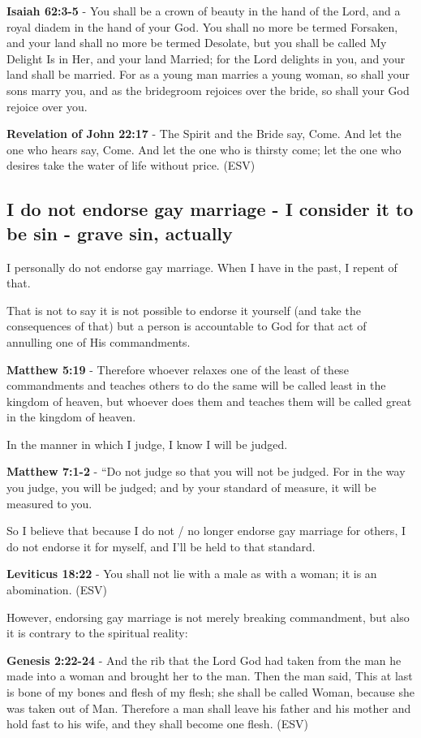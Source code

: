 \documentclass[11pt]{article}
\begin{document}
\textbf{Isaiah 62:3-5} - You shall be a crown of beauty in the hand of the Lord, and a royal diadem in the hand of your God. You shall no more be termed Forsaken, and your land shall no more be termed Desolate, but you shall be called My Delight Is in Her, and your land Married; for the Lord delights in you, and your land shall be married. For as a young man marries a young woman, so shall your sons marry you, and as the bridegroom rejoices over the bride, so shall your God rejoice over you.

\textbf{Revelation of John 22:17} - The Spirit and the Bride say, Come. And let the one who hears say, Come. And let the one who is thirsty come; let the one who desires take the water of life without price. (ESV)

\subsection{I do not endorse gay marriage - I consider it to be sin - grave sin, actually}
\label{sec:org8e55b81}
I personally do not endorse gay marriage. When I have in the past, I repent of that.

That is not to say it is not possible to endorse it yourself (and take the consequences of that) but a person is accountable to God for that act of annulling one of His commandments.

\textbf{Matthew 5:19} - Therefore whoever relaxes one of the least of these commandments and teaches others to do the same will be called least in the kingdom of heaven, but whoever does them and teaches them will be called great in the kingdom of heaven.

In the manner in which I judge, I know I will be judged.

\textbf{Matthew 7:1-2} - “Do not judge so that you will not be judged. For in the way you judge, you will be judged; and by your standard of measure, it will be measured to you.

So I believe that because I do not / no longer
endorse gay marriage for others, I do not
endorse it for myself, and I'll be held to
that standard.

\textbf{Leviticus 18:22} - You shall not lie with a male as with a woman; it is an abomination. (ESV)

However, endorsing gay marriage is not merely breaking commandment, but also it is contrary to the spiritual reality:

\textbf{Genesis 2:22-24} - And the rib that the Lord God had taken from the man he made into a woman and brought her to the man. Then the man said, This at last is bone of my bones and flesh of my flesh; she shall be called Woman, because she was taken out of Man. Therefore a man shall leave his father and his mother and hold fast to his wife, and they shall become one flesh. (ESV)
\end{document}
